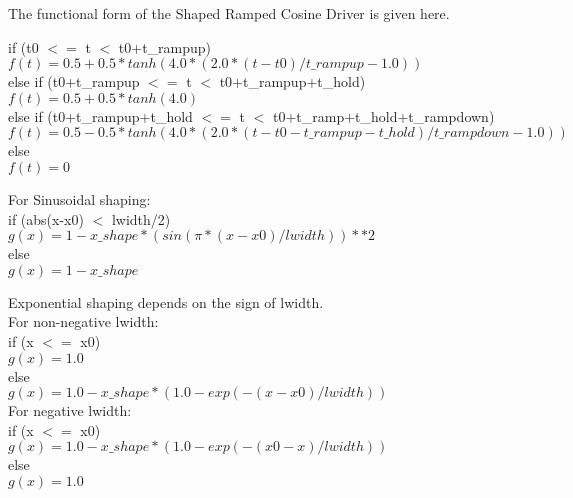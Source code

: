 \documentclass[11pt]{amsart}
\begin{document}
The functional form of the Shaped Ramped Cosine Driver is given here.

\noindent if (t0 $<=$ t $<$ t0+t\_rampup) \\
\indent \begin{math}f(t) = 0.5+0.5*tanh(4.0*(2.0*(t-t0)/t\_rampup-1.0)) \end{math} \\
else if (t0+t\_rampup $<=$ t $<$ t0+t\_rampup+t\_hold) \\
\indent \begin{math}f(t) = 0.5+0.5*tanh(4.0) \end{math} \\
else if (t0+t\_rampup+t\_hold $<=$ t $<$ t0+t\_ramp+t\_hold+t\_rampdown) \\
\indent \begin{math}f(t) = 0.5-0.5*tanh(4.0*(2.0*(t-t0-t\_rampup-t\_hold)/t\_rampdown-1.0)) \end{math} \\
else \\
\indent \begin{math}f(t) = 0\end{math}

\noindent For Sinusoidal shaping: \\
\noindent if (abs(x-x0) $<$ lwidth/2) \\
\indent \begin{math}g(x) = 1-x\_shape*(sin(\pi*(x-x0)/lwidth))**2\end{math} \\
else \\
\indent \begin{math}g(x) = 1-x\_shape\end{math}

Exponential shaping depends on the sign of lwidth. \\
For non-negative lwidth: \\
\noindent if (x $<=$ x0) \\
\indent \begin{math}g(x) = 1.0\end{math} \\
else \\
\indent \begin{math}g(x) = 1.0-x\_shape*(1.0-exp(-(x-x0)/lwidth))\end{math} \\
For negative lwidth: \\
\noindent if (x $<=$ x0) \\
\indent \begin{math}g(x) = 1.0-x\_shape*(1.0-exp(-(x0-x)/lwidth))\end{math} \\
else \\
\indent \begin{math}g(x) = 1.0\end{math}
\end{document}
